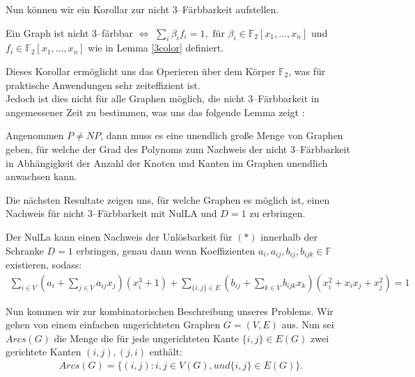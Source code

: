 \noindent Nun können wir ein Korollar zur nicht 3--Färbbarkeit aufstellen.

\begin{corollary}
Ein Graph ist nicht 3--färbbar $\Leftrightarrow$ $\sum_i \beta_if_i = 1, \text{ für } \beta_i \in \mathbb{F}_2[x_1,\ldots,x_n]$ und $f_i \in \mathbb{F}_2[x_1,\ldots,x_n]$ wie in Lemma \ref{3color} definiert. 
\end{corollary}

\noindent Dieses Korollar ermöglicht uns das Operieren über dem Körper $\mathbb{F}_2$, was für praktische Anwendungen sehr zeiteffizient ist. \cite{Loera2011} \\

\noindent Jedoch ist dies nicht für alle Graphen möglich, die nicht 3--Färbbarkeit in angemessener Zeit zu bestimmen, was uns das folgende Lemma zeigt \cite{Loera2009}:

\begin{lemma}
Angenommen $P \not = NP$, dann muss es eine unendlich große Menge von Graphen geben, für welche der Grad des Polynoms zum Nachweis der nicht 3--Färbbarkeit in Abhängigkeit der Anzahl der Knoten und Kanten im Graphen unendlich anwachsen kann.
\end{lemma}

Die nächsten Resultate zeigen uns, für welche Graphen es möglich ist, einen Nachweis für nicht 3--Färbbarkeit mit NulLA und $D=1$ zu erbringen. 

\begin{definition} \label{Polynomdarstellung}
Der NulLa kann einen Nachweis der Unlösbarkeit für $(\ast)$ innerhalb der Schranke $D=1$ erbringen, genau dann wenn Koeffizienten $a_i, a_{ij}, b_{ij},b_{ijk} \in \mathbb{F}$ existieren, sodass:
\begin{align*}
\sum_{i \in V}\left(a_i + \sum_{j\in V}a_{ij}x_j\right)(x_i^3+1)+\sum_{\{i,j\}\in E}\left(b_{ij}+\sum_{k\in V}b_{ijk}x_k\right)(x_i^2+x_ix_j+x_j^2)=1
\end{align*}
\end{definition}

\noindent Nun kommen wir zur kombinatorischen Beschreibung unseres Problems. Wir gehen von einem einfachen ungerichteten Graphen $G=(V,E)$ aus. Nun sei $Arcs(G)$ die Menge die für jede ungerichteten Kante $\{i,j\}\in E(G)$ zwei gerichtete Kanten $(i,j),(j,i)$ enthält:
\begin{align*}
Arcs(G) = \{(i,j):i,j \in V(G), und \{i,j\}\in E(G)\}.
\end{align*}
 
